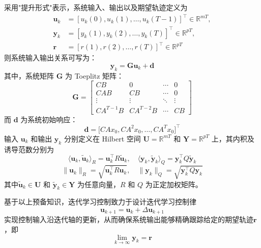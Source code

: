 采用"提升形式"表示，系统输入、输出以及期望轨迹定义为
\begin{align}
	\mathbf{u}_k &= [u_k(0), u_k(1),\dots,u_k(T-1)]^\top \in \mathbb{R}^{mT},\\
	\mathbf{y}_k &= [y_k(1), y_k(2),\dots,y_k(T)]^\top \in \mathbb{R}^{pT},\\
	\mathbf{r} &= [r(1), r(2),\dots,r(T)]^\top \in \mathbb{R}^{pT}
	\label{eq:lifted}
\end{align}
则系统输入输出关系可写为：
\begin{equation}
	\mathbf{y}_k = \mathbf{G} \mathbf{u}_k + \mathbf{d}
\end{equation}
其中，系统矩阵 $\mathbf{G}$ 为 Toeplitz 矩阵：
\begin{equation}
	\mathbf{G} = \begin{bmatrix}
		CB & 0 & \cdots & 0 \\
		CAB & CB & \cdots & 0 \\
		\vdots & \vdots & \ddots & \vdots \\
		CA^{T-1}B & CA^{T-2}B & \cdots & CB
	\end{bmatrix}
\end{equation}
而 $\mathbf{d}$ 为系统初始响应：
\begin{equation}
	\mathbf{d} = \big[ CAx_0, CA^{2}x_0, \dots, CA^{T}x_0 \big]^\top
\end{equation}
输入 $\mathbf{u}_k$ 和输出 $\mathbf{y}_k$ 分别定义在 Hilbert 空间 $\mathbf{U} = \mathbb{R}^{mT}$ 和 $\mathbf{Y} = \mathbb{R}^{pT}$ 上，其内积及诱导范数分别为
\begin{equation}
	\langle \mathbf{u}_k, \tilde{\mathbf{u}}_k \rangle_R = \mathbf{u}_k^\top R \tilde{\mathbf{u}}_k, \quad \langle \mathbf{y}_k, \tilde{\mathbf{y}}_k \rangle_Q = \mathbf{y}_k^\top Q \tilde{\mathbf{y}}_k
	\label{eq:inner}
\end{equation}
\begin{equation}
	\|\mathbf{u}_k\|_R = \sqrt{\mathbf{u}_k^\top R \mathbf{u}_k}, \quad \|\mathbf{y}_k\|_Q = \sqrt{\mathbf{y}_k^\top Q \mathbf{y}_k}
	\label{eq:norm}
\end{equation}
其中\(\tilde{\mathbf{u}}_k \in \mathbf{U}\) 和 \(\tilde{\mathbf{y}}_k \in \mathbf{Y}\) 为任意向量，$R$ 和 $Q$ 为正定加权矩阵。

基于以上预备知识，迭代学习控制致力于设计迭代学习控制律
\begin{equation}
	\mathbf{u}_{k+1}=\mathbf{u}_k+\Delta \mathbf{u}_{k+1}
	\label{kongzhiqi}
\end{equation}
实现控制输入沿迭代轴的更新，从而确保系统输出能够精确跟踪给定的期望轨迹$\mathbf{r}$，即
\begin{equation}
	\lim_{k\to\infty} \mathbf{y}_k=\mathbf{r}
	\label{mubiao}
\end{equation}

